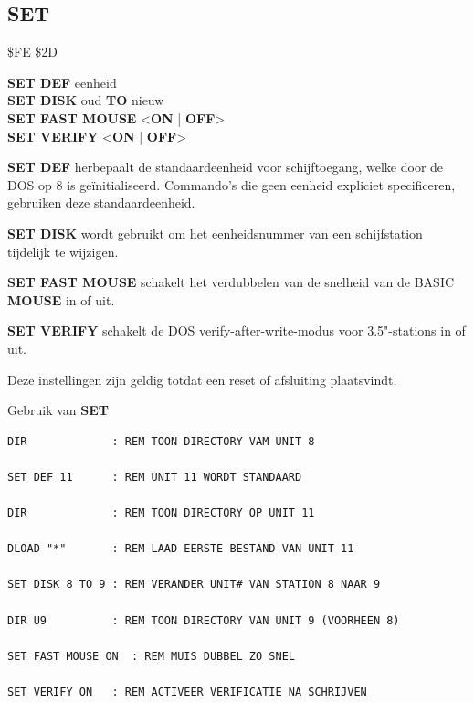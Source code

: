 
\newpage
\subsection{SET}
\begin{description}[leftmargin=2cm,style=nextline]
\item [Token:]    \$FE \$2D

\item [Formaat:]   {\bf SET DEF} eenheid \\               {\bf SET DISK} oud {\bf TO} nieuw \\                  {\bf SET FAST MOUSE} <{\bf ON} | {\bf OFF}> \\                  {\bf SET VERIFY} <{\bf ON} | {\bf OFF}>

\item [Gebruik:]    {\bf SET DEF} herbepaalt de standaardeenheid voor schijftoegang, welke door de DOS op 8 is geïnitialiseerd. Commando's die geen eenheid expliciet specificeren, gebruiken deze standaardeenheid.

                  {\bf SET DISK} wordt gebruikt om het eenheidsnummer van een schijfstation tijdelijk te wijzigen.

                  {\bf SET FAST MOUSE} schakelt het verdubbelen van de snelheid van de BASIC {\bf MOUSE} in of uit.

                  {\bf SET VERIFY} schakelt de DOS verify-after-write-modus voor 3.5"-stations in of uit.

\item [Opmerkingen:]  Deze instellingen zijn geldig totdat een reset of afsluiting plaatsvindt.

\item [Voorbeelden:] Gebruik van {\bf SET}

\begin{tcolorbox}[colback=black,coltext=white]
\verbatimfont{\codefont}
\begin{verbatim}
DIR             : REM TOON DIRECTORY VAM UNIT 8

SET DEF 11      : REM UNIT 11 WORDT STANDAARD

DIR             : REM TOON DIRECTORY OP UNIT 11

DLOAD "*"       : REM LAAD EERSTE BESTAND VAN UNIT 11

SET DISK 8 TO 9 : REM VERANDER UNIT# VAN STATION 8 NAAR 9

DIR U9          : REM TOON DIRECTORY VAN UNIT 9 (VOORHEEN 8)

SET FAST MOUSE ON  : REM MUIS DUBBEL ZO SNEL

SET VERIFY ON   : REM ACTIVEER VERIFICATIE NA SCHRIJVEN
\end{verbatim}
\end{tcolorbox}
\end{description}

